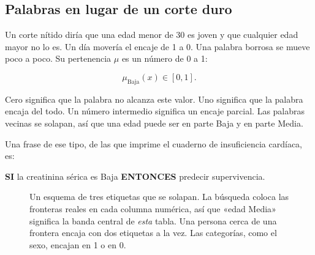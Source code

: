 \documentclass[11pt]{article}
\begin{document}
\subsection{Palabras en lugar de un corte duro}

Un corte nítido diría que una edad menor de 30 es joven y que cualquier edad mayor no lo es. Un día movería el encaje de 1 a 0. Una palabra borrosa se mueve poco a poco. Su pertenencia \(\mu\) es un número de 0 a 1:

\[
\mu_{\mathrm{Baja}}(x) \in [0, 1].
\]

Cero significa que la palabra no alcanza este valor. Uno significa que la palabra encaja del todo. Un número intermedio significa un encaje parcial. Las palabras vecinas se solapan, así que una edad puede ser en parte Baja y en parte Media.

Una frase de ese tipo, de las que imprime el cuaderno de insuficiencia cardíaca, es:

\begin{center}
{\sffamily\bfseries SI} la creatinina sérica es Baja \textbf{ENTONCES} predecir supervivencia.
\end{center}

\begin{figure}[H]
\centering
{}
\caption{Un esquema de tres etiquetas que se solapan. La búsqueda coloca las fronteras reales en cada columna numérica, así que «edad Media» significa la banda central de \emph{esta} tabla. Una persona cerca de una frontera encaja con dos etiquetas a la vez. Las categorías, como el sexo, encajan en 1 o en 0.}
\end{figure}
\end{document}
